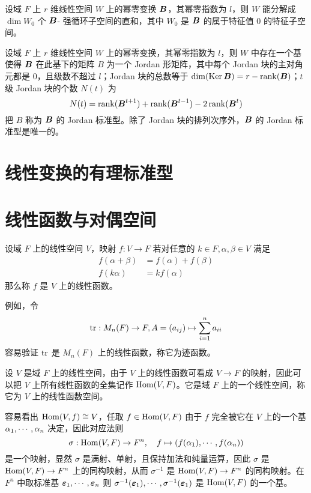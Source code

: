 \begin{theorem}
    设域 $F$ 上 $r$ 维线性空间 $W$ 上的幂零变换 $\boldsymbol{B}$，其幂零指数为 $l$，则 $W$ 能分解成 $\dim W_0$ 个 $\boldsymbol{B}$- 强循环子空间的直和，其中 $W_0$ 是 $\boldsymbol{B}$ 的属于特征值 $0$ 的特征子空间。
\end{theorem}

\begin{theorem}
    设域 $F$ 上 $r$ 维线性空间 $W$ 上的幂零变换，其幂零指数为 $l$，则 $W$ 中存在一个基使得 $\boldsymbol{B}$ 在此基下的矩阵 $B$ 为一个 Jordan 形矩阵，其中每个 Jordan 块的主对角元都是 $0$，且级数不超过 $l$；Jordan 块的总数等于 $\dim(\operatorname{Ker} \boldsymbol{B}) = r - \operatorname{rank}(\boldsymbol{B})$；$t$ 级 Jordan 块的个数 $N(t)$ 为
    \[ N(t) = \operatorname{rank}(\boldsymbol{B}^{t+1}) + \operatorname{rank}(\boldsymbol{B}^{t-1}) - 2 \operatorname{rank}(\boldsymbol{B}^t) \]
    把 $B$ 称为 $\boldsymbol{B}$ 的 Jordan 标准型。除了 Jordan 块的排列次序外，$\boldsymbol{B}$ 的 Jordan 标准型是唯一的。
\end{theorem}

\section{线性变换的有理标准型}

\section{线性函数与对偶空间}

\begin{definition}[线性函数]
    设域 $F$ 上的线性空间 $V$，映射 $f : V \to F$ 若对任意的 $k \in F, \alpha,\beta \in V$ 满足
    \begin{equation*}
        \begin{aligned}
            f(\alpha+\beta) &= f(\alpha) + f(\beta) \\
            f(k\alpha) &= kf(\alpha)
        \end{aligned}
    \end{equation*}
    那么称 $f$ 是 $V$ 上的线性函数。
\end{definition}

例如，令
\[ \operatorname{tr} : M_n(F) \to F, A = (a_{ij}) \mapsto \sum_{i=1}^{n} a_{ii} \]
容易验证 $\operatorname{tr}$ 是 $M_n(F)$ 上的线性函数，称它为迹函数。

设 $V$ 是域 $F$ 上的线性空间，由于 $V$ 上的线性函数可看成 $V \to F$ 的映射，因此可以把 $V$ 上所有线性函数的全集记作 $\operatorname{Hom}(V,F)$。它是域 $F$ 上的一个线性空间，称它为 $V$ 上的线性函数空间。

容易看出 $\operatorname{Hom}(V,f) \cong V$，任取 $f \in \operatorname{Hom}(V,F)$ 由于 $f$ 完全被它在 $V$ 上的一个基 $\alpha_1,\cdots,\alpha_n$ 决定，因此对应法则
\[ \sigma : \operatorname{Hom}(V,F) \to F^n, \quad f \mapsto (f(\alpha_1),\cdots,f(\alpha_n)) \]
是一个映射，显然 $\sigma$ 是满射、单射，且保持加法和纯量运算，因此 $\sigma$ 是 $\operatorname{Hom}(V,F) \to F^n$ 上的同构映射，从而 $\sigma^{-1}$ 是 $\operatorname{Hom}(V,F) \to F^n$ 的同构映射。在 $F^n$ 中取标准基 $\boldsymbol{\varepsilon}_1,\cdots,\boldsymbol{\varepsilon}_n$ 则 $\sigma^{-1}(\boldsymbol{\varepsilon}_1),\cdots,\sigma^{-1}(\boldsymbol{\varepsilon}_1)$ 是 $\operatorname{Hom}(V,F)$ 的一个基。

